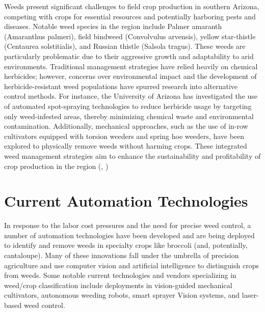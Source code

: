 \documentclass[letterpaper]{report}
\begin{document}
Weeds present significant challenges to field crop production in southern Arizona, competing with crops for essential resources and potentially harboring pests and diseases. Notable weed species in the region include Palmer amaranth (Amaranthus palmeri), field bindweed (Convolvulus arvensis), yellow star-thistle (Centaurea solstitialis), and Russian thistle (Salsola tragus). These weeds are particularly problematic due to their aggressive growth and adaptability to arid environments. Traditional management strategies have relied heavily on chemical herbicides; however, concerns over environmental impact and the development of herbicide-resistant weed populations have spurred research into alternative control methods. For instance, the University of Arizona has investigated the use of automated spot-spraying technologies to reduce herbicide usage by targeting only weed-infested areas, thereby minimizing chemical waste and environmental contamination. Additionally, mechanical approaches, such as the use of in-row cultivators equipped with torsion weeders and spring hoe weeders, have been explored to physically remove weeds without harming crops. These integrated weed management strategies aim to enhance the sustainability and profitability of crop production in the region (\cite{Sturla2022-ug}, \cite{University-or-Arizona-CALESUnknown-qj}) 

\section{Current Automation Technologies}

In response to the labor cost pressures and the need for precise weed control, a number of automation technologies have been developed and are being deployed to identify and remove weeds in specialty crops like broccoli (and, potentially, cantaloupe). Many of these innovations fall under the umbrella of precision agriculture and use computer vision and artificial intelligence to distinguish crops from weeds. Some notable current technologies and vendors specializing in weed/crop classification include deployments in vision-guided mechanical cultivators, autonomous weeding robots, smart sprayer Vision systems, and laser-based weed control.
\end{document}
